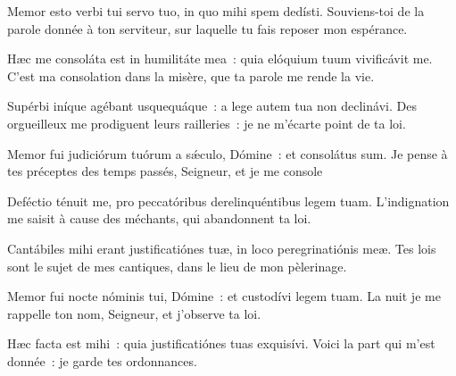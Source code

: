 \begin{paracol}{2}

\LigneParacol{0cm}
{Memor esto verbi tui servo tuo, \GreStar{} in quo mihi spem dedísti.}
{Souviens-toi de la parole donnée à ton serviteur, sur laquelle tu fais reposer mon espérance.}

\LigneParacol{0.2cm}
{Hæc me consoláta est in humilitáte mea~: \GreStar{} quia elóquium tuum vivificávit me.}
{C'est ma consolation dans la misère, que ta parole me rende la vie.}

\LigneParacol{0.2cm}
{Supérbi iníque agébant usquequáque~: \GreStar{} a lege autem tua non declinávi.}
{Des orgueilleux me prodiguent leurs railleries~: je ne m'écarte point de ta loi.}

\LigneParacol{0.2cm}
{Memor fui judiciórum tuórum a sǽculo, Dómine~: \GreStar{} et consolátus sum.}
{Je pense à tes préceptes des temps passés, Seigneur, et je me console}

\LigneParacol{0.2cm}
{Deféctio ténuit me, \GreStar{} pro peccatóribus derelinquéntibus legem tuam.}
{L'indignation me saisit à cause des méchants, qui abandonnent ta loi.}

\LigneParacol{0.2cm}
{Cantábiles mihi erant justificatiónes tuæ, \GreStar{} in loco peregrinatiónis meæ.}
{Tes lois sont le sujet de mes cantiques, dans le lieu de mon pèlerinage.}

\LigneParacol{0.2cm}
{Memor fui nocte nóminis tui, Dómine~: \GreStar{} et custodívi legem tuam.}
{La nuit je me rappelle ton nom, Seigneur, et j'observe ta loi.}

\LigneParacol{0.2cm}
{Hæc facta est mihi~: \GreStar{} quia justificatiónes tuas exquisívi.}
{Voici la part qui m'est donnée~: je garde tes ordonnances.}

\end{paracol}
